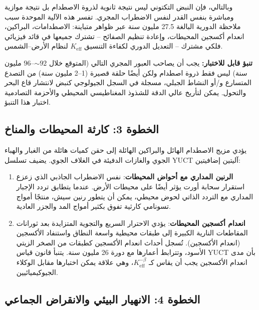 \documentclass[11pt,a4paper]{article}
\begin{document}
	وبالتالي، فإن النبض التكتوني ليس نتيجة ثانوية لذروة الاصطدام بل نتيجة موازية ومباشرة بنفس القدر لنفس الاضطراب المجري.  
	تفسر هذه الآلية الموحدة سبب ملاحظة الدورية البالغة 27.5 مليون سنة عبر ظواهر متباينة: الاصطدامات، البراكين، انعدام أكسجين المحيطات، وإعادة تنظيم الصفائح – تشترك جميعها في قائد فيزيائي فلكي مشترك – التعديل الدوري لكفاءة التنسيق \(K_{\mathrm{eff}}\) لنظام الأرض–الشمس.
	
	\vspace{0.2cm}
	\noindent
	\textbf{تنبؤ قابل للاختبار:} يجب أن يصاحب العبور المجري التالي (المتوقع خلال \(\sim 92\)–\(96\) مليون سنة) ليس فقط ذروة اصطدام ولكن أيضًا حلقة قصيرة (1–2 مليون سنة) من التصدع المتسارع و/أو النشاط الجبلي، مسجلة في السجل الجيولوجي كنبض لانتشار قاع البحر والتحول. يمكن لتأريخ عالي الدقة للشذوذ المغناطيسي المحيطي والأحزمة التصادمية اختبار هذا التنبؤ.
	
	\subsection{الخطوة 3: كارثة المحيطات والمناخ}
	
	يؤدي مزيج الاصطدام الهائل والبراكين الهائلة إلى حقن كميات هائلة من الغبار والهباء الجوي والغازات الدفيئة في الغلاف الجوي. 
	يضيف تسلسل YUCT آليتين إضافيتين:
	\begin{enumerate}
		\item \textbf{الرنين المداري مع أحواض المحيطات}: نفس الاضطراب الجاذبي الذي زعزع استقرار سحابة أورت يؤثر أيضًا على محيطات الأرض. عندما يتطابق تردد الإجبار المداري مع التردد الذاتي لحوض محيطي، يمكن أن يتطور رنين سيش، منتجًا أمواج تسونامي كارثية تفوق بكثير أمواج المد والجزر العادية.
		\item \textbf{انعدام أكسجين المحيطات}: يؤدي الاحترار السريع والتجوية المتزايدة بعد ثورانات المقاطعات النارية الكبيرة إلى طبقات محيطية واسعة النطاق واستنفاد الأكسجين (انعدام الأكسجين). تُسجل أحداث انعدام الأكسجين كطبقات من الصخر الزيتي الأسود، وتترابط أعمارها مع دورة 26 مليون سنة. يتنبأ قانون قياس YUCT بأن مدى انعدام الأكسجين يجب أن يقاس كـ \(K_{\mathrm{eff}}^{-\beta}\)، وهي علاقة يمكن اختبارها مقابل الوكلاء الجيوكيميائيين.
	\end{enumerate}
	
	\subsection{الخطوة 4: الانهيار البيئي والانقراض الجماعي}
	
\end{document}
